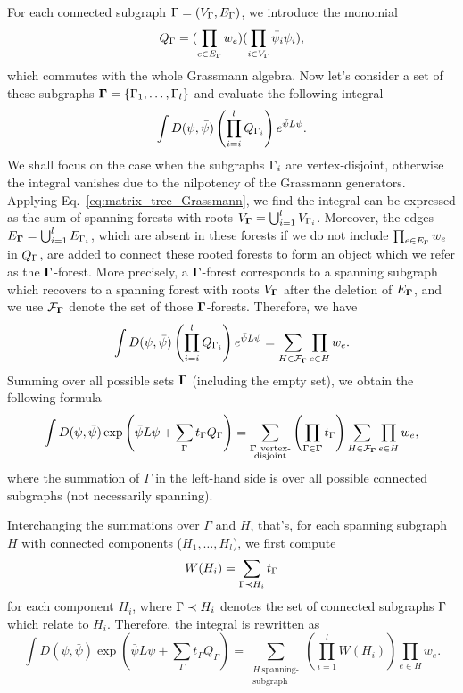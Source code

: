 For each connected subgraph ${\Gamma} = (V_{{\Gamma}}, E_{{\Gamma}})$, we introduce the monomial 
\begin{equation}
	Q_{{\Gamma}} = (\prod_{e\in E_{\Gamma}}w_e)(\prod_{i\in V_{{\Gamma}}}\bar{{\psi}}_i {\psi}_i),
\end{equation}
which commutes with the whole Grassmann algebra. Now let's consider a set of these subgraphs $\bm{\Gamma} = \{{\Gamma}_1, \dots, {\Gamma}_l\}$ and
evaluate the following integral
\begin{equation}
	\int D({\psi}, \bar{{\psi}}) \left(\prod_{i=i}^l Q_{{\Gamma}_i}\right) e^{\bar{{\psi}} L {\psi}}.
\end{equation}
We shall focus on the case when the subgraphs ${\Gamma}_i$ are vertex-disjoint, otherwise the integral vanishes due to the nilpotency of the Grassmann generators.
Applying Eq.~\eqref{eq:matrix_tree_Grassmann}, we find the integral can be expressed as the sum of spanning forests with roots $V_{\bm{\Gamma}} = \bigcup_{i=1}^{l} V_{{\Gamma}_i}$.
Moreover, the edges $E_{\bm{\Gamma}} = \bigcup_{i=1}^l E_{{\Gamma}_i}$, which are absent in these forests if we do not include $\prod_{e\in E_{{\Gamma}}} w_e$ in $Q_{{\Gamma}}$, are added to
connect these rooted forests to form an object which we refer as the $\bm{{\Gamma}}$-forest. More precisely, a $\bm{{\Gamma}}$-forest corresponds to a spanning subgraph which recovers
to a spanning forest with roots $V_{\bm {{\Gamma}}}$ after the deletion of $E_{\bm{{\Gamma}}}$, and we use ${\mathcal F}_{\bm{{\Gamma}}}$ denote the set of those $\bm{{\Gamma}}$-forests. Therefore, we have
\begin{equation}
	\int D({\psi}, \bar{{\psi}}) \left(\prod_{i=i}^l Q_{{\Gamma}_i}\right) e^{\bar{{\psi}} L {\psi}} = \sum_{H \in {\mathcal F}_{\bm{\Gamma}}} \prod_{e\in H} w_e.
\end{equation} 
Summing over all possible sets $\bm{{\Gamma}}$ (including the empty set), we obtain the following formula
\begin{equation}
	\int D(\psi, \bar{\psi}) \exp\left(\bar{\psi} L \psi+\sum_{\Gamma} t_{\Gamma} Q_{\Gamma}\right)=
	\sum_{\substack{\bm{{\Gamma}}\  \text{vertex-}\\ \text{disjoint}} }\left(\prod_{\Gamma \in {\bm{\Gamma}}} t_{\Gamma}\right) \sum_{H \in \mathcal{F}_{\bm{{\Gamma}}}} \prod_{e \in H} w_{e},
\end{equation}
where the summation of $\Gamma$ in the left-hand side is over all possible connected subgraphs (not necessarily spanning).

Interchanging the summations over $\Gamma$ and $H$, that's, for each spanning subgraph $H$ with connected components ($H_1, \dots, H_l$), 
we first compute
\begin{equation}
	W(H_i) = \sum_{{\Gamma} \prec H_i} t_{{\Gamma}}
\end{equation}
for each component $H_i$, where ${\Gamma} \prec H_i$ denotes the set of connected subgraphs ${\Gamma}$ which relate to $H_i$.
Therefore, the integral is rewritten as
\begin{equation}
	\int D(\psi, \bar{\psi}) \exp\left(\bar{\psi} L \psi+\sum_{\Gamma} t_{\Gamma} Q_{\Gamma}\right)=
	\sum_{\substack{H\ \text{spanning-}\\ \text{subgraph}}} \left(\prod_{i=1}^l W(H_i)\right) \prod_{e \in H} w_{e}.
\end{equation}

